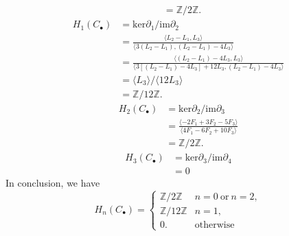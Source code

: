 \documentclass[a4paper, 11pt]{article}
\begin{document}
\begin{solution}
\begin{align*}
                   & = \mathbb{Z}/2 \mathbb{Z}.
\end{align*}
\begin{align*}
    H_1(C_\bullet) & = \text{ker}{\partial_1}/\text{im}\partial_2\\
                   & = \frac{\langle L_2-L_1,L_3\rangle}{\langle 3(L_2-L_1), (L_2-L_1)-4L_3\rangle}\\ 
                   & = \frac{\langle (L_2-L_1)-4L_3,L_3\rangle}{\langle 3[(L_2-L_1)-4L_3]+12L_3, (L_2-L_1)-4L_3\rangle}\\ 
                   & = \langle L_3\rangle/\langle 12L_3\rangle \\ 
                   & =\mathbb{Z}/ 12 \mathbb{Z}.
\end{align*}
\begin{align*}
    H_2(C_\bullet) & = \text{ker}{\partial_2}/\text{im}\partial_3\\
                   & = \frac{\langle -2F_1+3F_2-5F_3\rangle}{\langle 4F_1-6F_2+10F_3\rangle}\\ 
                   & =\mathbb{Z}/2 \mathbb{Z}.
\end{align*}
\begin{align*}
    H_3(C_\bullet) & = \text{ker}{\partial_3}/\text{im}\partial_4\\
                   & = 0
\end{align*}
In conclusion, we have 
$$H_n(C_\bullet)=\begin{cases}
    \mathbb{Z}/2 \mathbb{Z} & n=0\ \text{or} \ n=2,\\ 
    \mathbb{Z}/12 \mathbb{Z} & n=1,\\ 
    0. & \text{otherwise} 
\end{cases}$$

\end{solution}
\end{document}
